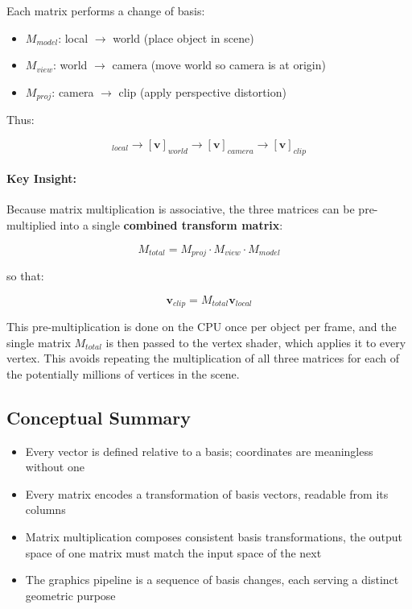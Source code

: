 \documentclass[11pt]{article}
\begin{document}
Each matrix performs a change of basis:

\begin{itemize}
    \item $M_{model}$: local $\rightarrow$ world (place object in scene)
    \item $M_{view}$: world $\rightarrow$ camera (move world so camera is at origin)
    \item $M_{proj}$: camera $\rightarrow$ clip (apply perspective distortion)
\end{itemize}

Thus:

\begin{equation}
    [\mathbf{v}]_{local}
    \rightarrow
    [\mathbf{v}]_{world}
    \rightarrow
    [\mathbf{v}]_{camera}
    \rightarrow
    [\mathbf{v}]_{clip}
\end{equation}

\paragraph{Key Insight:}

Because matrix multiplication is associative, the three matrices can be pre-multiplied into a single \textbf{combined transform matrix}:

\begin{equation}
    M_{total} = M_{proj} \cdot M_{view} \cdot M_{model}
\end{equation}

so that:

\begin{equation}
    \mathbf{v}_{clip} = M_{total} \mathbf{v}_{local}
\end{equation}

This pre-multiplication is done on the CPU once per object per frame, and the single matrix $M_{total}$ is then passed to the vertex shader, which applies it to every vertex. This avoids repeating the multiplication of all three matrices for each of the potentially millions of vertices in the scene.

\subsection{Conceptual Summary}

\begin{itemize}
    \item Every vector is defined relative to a basis; coordinates are meaningless without one
    \item Every matrix encodes a transformation of basis vectors, readable from its columns
    \item Matrix multiplication composes consistent basis transformations, the output space of one matrix must match the input space of the next
    \item The graphics pipeline is a sequence of basis changes, each serving a distinct geometric purpose
\end{itemize}
\end{document}
